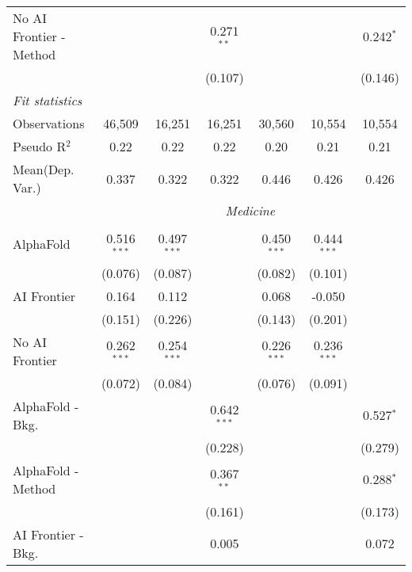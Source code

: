 \begin{tabular}{lcccccc}
   No AI Frontier - Method &               &              & 0.271$^{**}$  &               &              & 0.242$^{*}$\\   
                           &               &              & (0.107)       &               &              & (0.146)\\   
   \midrule
   \emph{Fit statistics}\\
   Observations            & 46,509        & 16,251       & 16,251        & 30,560        & 10,554       & 10,554\\  
   Pseudo R$^2$            & 0.22          & 0.22         & 0.22          & 0.20          & 0.21         & 0.21\\  
   
Mean(Dep. Var.) & 0.337 & 0.322 & 0.322 & 0.446 & 0.426 & 0.426 \\
 & \multicolumn{6}{c}{\textit{Medicine}} \\ \\
   AlphaFold               & 0.516$^{***}$ & 0.497$^{***}$ &               & 0.450$^{***}$ & 0.444$^{***}$ &   \\   
                           & (0.076)       & (0.087)       &               & (0.082)       & (0.101)       &   \\   
   AI Frontier             & 0.164         & 0.112         &               & 0.068         & -0.050        &   \\   
                           & (0.151)       & (0.226)       &               & (0.143)       & (0.201)       &   \\   
   No AI Frontier          & 0.262$^{***}$ & 0.254$^{***}$ &               & 0.226$^{***}$ & 0.236$^{***}$ &   \\   
                           & (0.072)       & (0.084)       &               & (0.076)       & (0.091)       &   \\   
   AlphaFold - Bkg.        &               &               & 0.642$^{***}$ &               &               & 0.527$^{*}$\\   
                           &               &               & (0.228)       &               &               & (0.279)\\   
   AlphaFold - Method      &               &               & 0.367$^{**}$  &               &               & 0.288$^{*}$\\   
                           &               &               & (0.161)       &               &               & (0.173)\\   
   AI Frontier - Bkg.      &               &               & 0.005         &               &               & 0.072\\   

\end{tabular}
